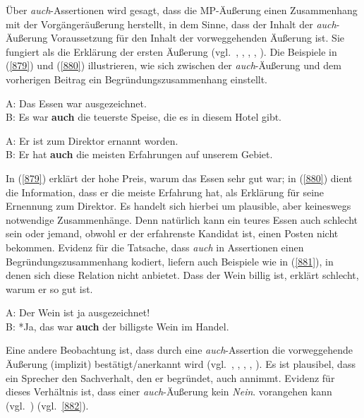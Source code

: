 {Über \textit{auch}-Assertionen wird gesagt, dass die MP-Äußerung einen Zusammenhang mit der Vorgängeräußerung herstellt, in dem Sinne, dass der Inhalt der \textit{auch}-Äußerung Voraussetzung für den Inhalt der vorweggehenden Äußerung ist. Sie fungiert als die Erklärung der ersten Äußerung (vgl.\ \citealt[47]{Dahl1988}, \citealt[160]{Thurmair1989}, \citealt[1226]{Zifonun1997}, \citealt[343]{Karagjosova2004}, \citealt[222]{Moellering2004}). Die Beispiele in (\ref{879}) und (\ref{880}) illustrieren, wie sich zwischen der \textit{auch}-Äußerung und dem vorherigen Beitrag ein Begründungszusammenhang einstellt.

\begin{exe}
	\ex\label{879}
	A: Das Essen war ausgezeichnet.\\
	B: Es war \textbf{auch} die teuerste Speise, die es in diesem Hotel gibt.	
\end{exe}

\begin{exe}
	\ex\label{880}
	A: Er ist zum Direktor ernannt worden.\\
	B: Er hat \textbf{auch} die meisten Erfahrungen auf unserem Gebiet.	 
	\newline
	\hbox{}\hfill\hbox{\citet[88]{Helbig1990}}
\end{exe}
In (\ref{879}) erklärt der hohe Preis, warum das Essen sehr gut war; in (\ref{880}) dient die Information, dass er die meiste Erfahrung hat, als Erklärung für seine Ernennung zum Direktor. Es handelt sich hierbei um plausible, aber keineswegs notwendige Zusammenhänge. Denn natürlich kann ein teures Essen auch schlecht sein oder jemand, obwohl er der erfahrenste Kandidat ist, einen Posten nicht bekommen. Evidenz für die Tatsache, dass \textit{auch} in Assertionen einen Begründungszusammenhang kodiert, liefern auch Beispiele wie in (\ref{881}), in denen sich diese Relation nicht anbietet. Dass der Wein billig ist, erklärt schlecht, warum er so gut ist.

\begin{exe}
	\ex\label{881}
	A: Der Wein ist ja ausgezeichnet!\\
	B: *Ja, das war \textbf{auch} der billigste Wein im Handel.	 
	\hfill\hbox{\citet[211]{Franck1980}}
\end{exe}
Eine andere Beobachtung ist, dass durch eine \textit{auch}-Assertion die vorweggehende Äußerung (implizit) bestätigt/anerkannt wird (vgl.\ \citealt[212]{Franck1980}, \citealt[160]{Thurmair1989}, \citealt[88]{Helbig1990}, \citealt[221--222]{Moellering2004}, \citealt[343]{Karagjosova2004}). Es ist plausibel, dass ein Sprecher den Sachverhalt, den er begründet, auch annimmt. Evidenz für dieses Verhältnis ist, dass einer \textit{auch}-Äußerung kein \textit{Nein}. vorangehen kann (vgl.\ \citealt[212]{Franck1980}) (vgl.\ \ref{882}).

}
